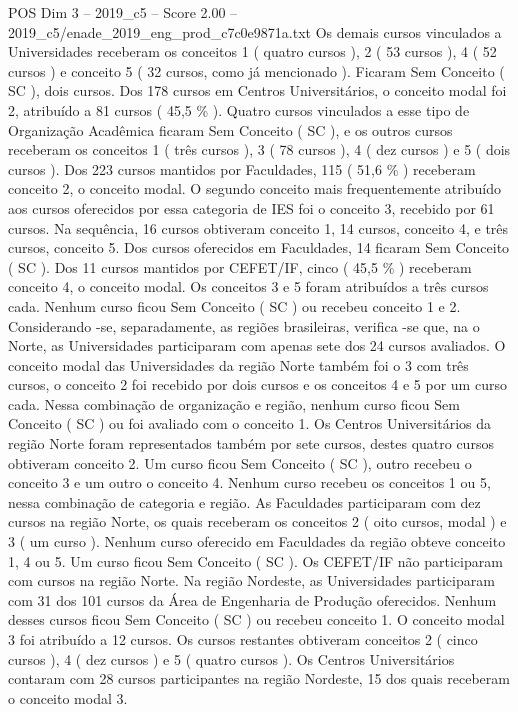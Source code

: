 \begin{textsample}{POS Dim 3 – 2019\_c5 – Score 2.00 – 2019\_c5/enade\_2019\_eng\_prod\_c7c0e9871a.txt}
Os demais cursos vinculados a Universidades receberam os conceitos 1 ( quatro cursos ), 2 ( 53 cursos ), 4 ( 52 cursos ) e conceito 5 ( 32 cursos, como já mencionado ).
Ficaram Sem Conceito ( SC ), dois cursos.
Dos 178 cursos em Centros Universitários, o conceito modal foi 2, atribuído a 81 cursos ( 45,5 \% ).
Quatro cursos vinculados a esse tipo de Organização Acadêmica ficaram Sem Conceito ( SC ), e os outros cursos receberam os conceitos 1 ( três cursos ), 3 ( 78 cursos ), 4 ( dez cursos ) e 5 ( dois cursos ).
Dos 223 cursos mantidos por Faculdades, 115 ( 51,6 \% ) receberam conceito 2, o conceito modal.
O segundo conceito mais frequentemente atribuído aos cursos oferecidos por essa categoria de IES foi o conceito 3, recebido por 61 cursos.
Na sequência, 16 cursos obtiveram conceito 1, 14 cursos, conceito 4, e três cursos, conceito 5.
Dos cursos oferecidos em Faculdades, 14 ficaram Sem Conceito ( SC ).
Dos 11 cursos mantidos por CEFET/IF, cinco ( 45,5 \% ) receberam conceito 4, o conceito modal.
Os conceitos 3 e 5 foram atribuídos a três cursos cada.
Nenhum curso ficou Sem Conceito ( SC ) ou recebeu conceito 1 e 2.
Considerando -se, separadamente, as regiões brasileiras, verifica -se que, na o Norte, as Universidades participaram com apenas sete dos 24 cursos avaliados.
O conceito modal das Universidades da região Norte também foi o 3 com três cursos, o conceito 2 foi recebido por dois cursos e os conceitos 4 e 5 por um curso cada.
Nessa combinação de organização e região, nenhum curso ficou Sem Conceito ( SC ) ou foi avaliado com o conceito 1.
Os Centros Universitários da região Norte foram representados também por sete cursos, destes quatro cursos obtiveram conceito 2.
Um curso ficou Sem Conceito ( SC ), outro recebeu o conceito 3 e um outro o conceito 4.
Nenhum curso recebeu os conceitos 1 ou 5, nessa combinação de categoria e região.
As Faculdades participaram com dez cursos na região Norte, os quais receberam os conceitos 2 ( oito cursos, modal ) e 3 ( um curso ).
Nenhum curso oferecido em Faculdades da região obteve conceito 1, 4 ou 5.
Um curso ficou Sem Conceito ( SC ).
Os CEFET/IF não participaram com cursos na região Norte.
Na região Nordeste, as Universidades participaram com 31 dos 101 cursos da Área de Engenharia de Produção oferecidos.
Nenhum desses cursos ficou Sem Conceito ( SC ) ou recebeu conceito 1.
O conceito modal 3 foi atribuído a 12 cursos.
Os cursos restantes obtiveram conceitos 2 ( cinco cursos ), 4 ( dez cursos ) e 5 ( quatro cursos ).
Os Centros Universitários contaram com 28 cursos participantes na região Nordeste, 15 dos quais receberam o conceito modal 3.

\end{textsample}
